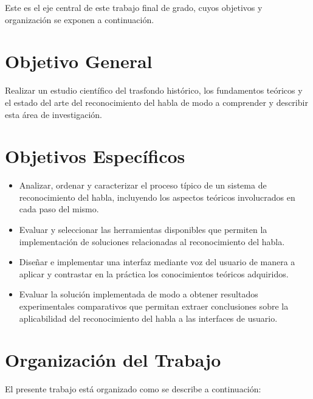 Este es el eje central de este trabajo final de grado, cuyos objetivos y organizaci\'on se
exponen a continuaci\'on.

\section{Objetivo General}
\label{sec:objgral}

Realizar un estudio cient\'{i}fico del trasfondo hist\'{o}rico, los fundamentos te\'{o}ricos 
y el estado del arte del reconocimiento del habla de modo a comprender y describir 
esta \'{a}rea de investigaci\'{o}n.  


\section{Objetivos Espec\'{i}ficos}
\label{sec:objspec}

\begin{itemize}
    \item Analizar, ordenar y caracterizar el proceso t\'{i}pico de un sistema de reconocimiento del habla, 
        incluyendo los aspectos te\'{o}ricos involucrados en cada paso del mismo.

    \item Evaluar y seleccionar las herramientas disponibles que permiten la implementaci\'{o}n de soluciones 
        relacionadas al reconocimiento del habla.
    
    \item Dise\~{n}ar e implementar una interfaz mediante voz del usuario de manera a aplicar y 
    contrastar en la pr\'{a}ctica los conocimientos te\'{o}ricos adquiridos.
    
    \item Evaluar la soluci\'{o}n implementada de modo a obtener resultados experimentales comparativos que 
        permitan extraer conclusiones sobre la aplicabilidad del reconocimiento del habla a las interfaces 
        de usuario.
\end{itemize}

\section{Organizaci\'on del Trabajo}
\label{sec:organizacion}


El presente trabajo est\'a organizado como se describe a continuaci\'on:

